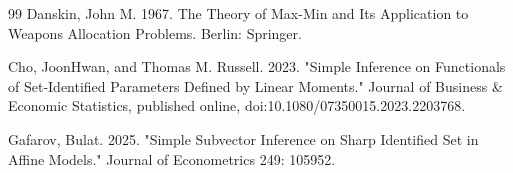 \documentclass{article}
\begin{document}
\begin{thebibliography}{99}
   Danskin, John M. 1967. The Theory of Max-Min and Its Application to Weapons Allocation Problems. Berlin: Springer.

   Cho, JoonHwan, and Thomas M. Russell. 2023. "Simple Inference on Functionals of Set-Identified Parameters Defined by Linear Moments." Journal of Business \& Economic Statistics, published online, doi:10.1080/07350015.2023.2203768.

   Gafarov, Bulat. 2025. "Simple Subvector Inference on Sharp Identified Set in Affine Models." Journal of Econometrics 249: 105952.

\end{thebibliography}
\end{document}
